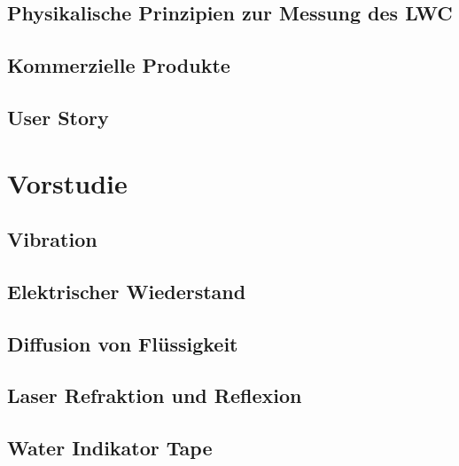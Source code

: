\documentclass[a4paper,12pt]{article}
\begin{document}
\subsection{Physikalische Prinzipien zur Messung des LWC}


\subsection{Kommerzielle Produkte}


\subsection{User Story}



\newpage
\section{Vorstudie}


\subsection{Vibration}


\newpage
\subsection{Elektrischer Wiederstand}


\newpage
\subsection{Diffusion von Flüssigkeit}
\label{sec:TinteVersuchsaufbau}


\subsection{Laser Refraktion und Reflexion}


\subsection{Water Indikator Tape}
\label{sec:5559}

\end{document}
